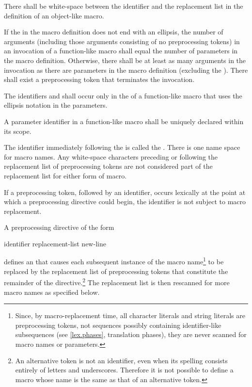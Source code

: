 \pnum
{}%
There shall be white-space between the identifier and the replacement list
in the definition of an object-like macro.

\pnum
If the  in the macro definition does not end with
an ellipsis, the number of arguments (including those arguments consisting
of no preprocessing tokens)
in an invocation of a function-like macro shall
equal the number of parameters in the macro definition.
Otherwise, there shall be at least as many arguments in the invocation as there are
parameters in the macro definition (excluding the ). There
shall exist a
\tcode{)}
preprocessing token that terminates the invocation.

\pnum
{}%
%
The identifiers  and 
shall occur only in the 
of a function-like macro that uses the ellipsis notation in the parameters.

\pnum
A parameter identifier in a function-like macro
shall be uniquely declared within its scope.

\pnum
The identifier immediately following the
is called the
%
.
There is one name space for macro names.
Any white-space characters preceding or following the
replacement list of preprocessing tokens are not considered
part of the replacement list for either form of macro.

\pnum
If a
\tcode{\#}
preprocessing token,
followed by an identifier,
occurs lexically
at the point at which a preprocessing directive could begin,
the identifier is not subject to macro replacement.

\pnum
A preprocessing directive of the form

\begin{ncsimplebnf}
 identifier replacement-list new-line
%
\end{ncsimplebnf}

defines an
 that
causes each subsequent instance of the macro name\footnote{Since, by macro-replacement time,
all character literals and string literals are preprocessing tokens,
not sequences possibly containing identifier-like subsequences
(see \ref{lex.phases}, translation phases),
they are never scanned for macro names or parameters.}
to be replaced by the replacement list of preprocessing tokens
that constitute the remainder of the directive.\footnote{An alternative token is not an identifier,
even when its spelling consists entirely of letters and underscores.
Therefore it is not possible to define a macro
whose name is the same as that of an alternative token.}
The replacement list is then rescanned for more macro names as
specified below.

